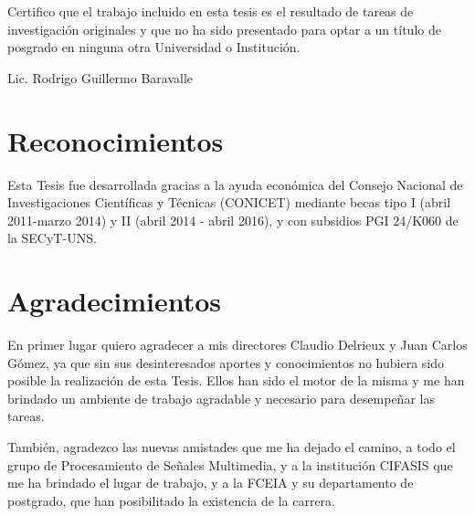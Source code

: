 \documentclass[spanish,a4paper,oneside,10pt,openright]{book}
\begin{document}
 \cleardoublepage


Certifico que el trabajo incluido en esta tesis es el resultado de tareas de investigación
originales y que no ha sido presentado para optar a un título de posgrado en ninguna otra
Universidad o Institución.

\vspace{3cm}
\begin{flushright}
Lic. Rodrigo Guillermo Baravalle
\end{flushright}
\cleardoublepage


\chapter*{Reconocimientos}
Esta Tesis fue desarrollada gracias a la ayuda económica del Consejo Nacional de Investigaciones Científicas y Técnicas (CONICET) mediante becas tipo I (abril 2011-marzo 2014) y II (abril 2014 - abril 2016), y con subsidios PGI 24/K060 de la SECyT-UNS.

\phantom{p. 1}
\clearpage
\thispagestyle{empty}
\phantom{p. 2}
\clearpage

\chapter*{Agradecimientos} %

En primer lugar quiero agradecer a mis directores Claudio Delrieux y Juan Carlos Gómez, ya que sin sus desinteresados aportes y conocimientos no hubiera sido posible la realización de esta Tesis. Ellos han sido el motor de la misma y me han brindado un ambiente de trabajo agradable y necesario para desempeñar las tareas.

También, agradezco las nuevas amistades que me ha dejado el camino, a todo el grupo de Procesamiento de Señales Multimedia, y a la institución CIFASIS que me ha brindado el lugar de trabajo, y a la FCEIA y su departamento de postgrado, que han posibilitado la existencia de la carrera.
\end{document}

